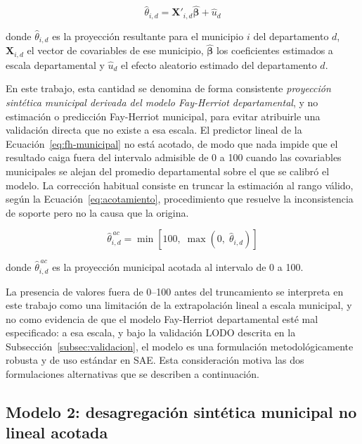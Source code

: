 \begin{equation}
    \hat{\theta}_{i,d} = \mathbf{X}'_{i,d} \hat{\boldsymbol{\beta}} + \hat{u}_d
    \label{eq:fh-municipal}
\end{equation}

\noindent donde $\hat{\theta}_{i,d}$ es la proyección resultante para el municipio $i$ del departamento $d$, $\mathbf{X}_{i,d}$ el vector de covariables de ese municipio, $\hat{\boldsymbol{\beta}}$ los coeficientes estimados a escala departamental y $\hat{u}_d$ el efecto aleatorio estimado del departamento $d$.

En este trabajo, esta cantidad se denomina de forma consistente \emph{proyección sintética municipal derivada del modelo Fay-Herriot departamental}, y no estimación o predicción Fay-Herriot municipal, para evitar atribuirle una validación directa que no existe a esa escala. El predictor lineal de la Ecuación~\ref{eq:fh-municipal} no está acotado, de modo que nada impide que el resultado caiga fuera del intervalo admisible de 0 a 100 cuando las covariables municipales se alejan del promedio departamental sobre el que se calibró el modelo. La corrección habitual consiste en truncar la estimación al rango válido, según la Ecuación~\ref{eq:acotamiento}, procedimiento que resuelve la inconsistencia de soporte pero no la causa que la origina.

\begin{equation}
    \hat{\theta}_{i,d}^{\,ac} = \min\!\left[100,\; \max(0,\; \hat{\theta}_{i,d})\right]
    \label{eq:acotamiento}
\end{equation}

\noindent donde $\hat{\theta}_{i,d}^{\,ac}$ es la proyección municipal acotada al intervalo de 0 a 100.

La presencia de valores fuera de 0--100 antes del truncamiento se interpreta en este trabajo como una limitación de la extrapolación lineal a escala municipal, y no como evidencia de que el modelo Fay-Herriot departamental esté mal especificado: a esa escala, y bajo la validación LODO descrita en la Subsección~\ref{subsec:validacion}, el modelo es una formulación metodológicamente robusta y de uso estándar en SAE. Esta consideración motiva las dos formulaciones alternativas que se describen a continuación.

\subsection{Modelo 2: desagregación sintética municipal no lineal acotada}
\label{subsec:no-lineal}

